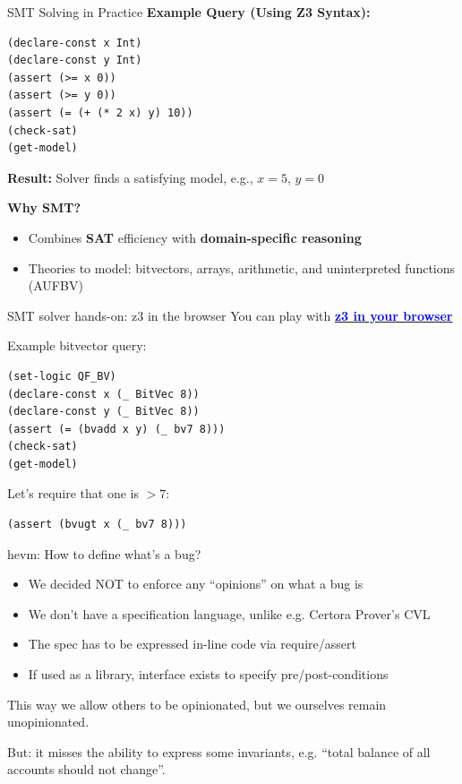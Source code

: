 \documentclass[aspectratio=169]{beamer}
\newcommand{\bluelink}[2]{\href{#1}{\textcolor{blue}{\textbf{#2}}}}
\begin{document}
\begin{frame}[fragile=singleslide]{SMT Solving in Practice}
\textbf{Example Query (Using Z3 Syntax):}
\begin{lstlisting}[language=smtlib]
(declare-const x Int)
(declare-const y Int)
(assert (>= x 0))
(assert (>= y 0))
(assert (= (+ (* 2 x) y) 10))
(check-sat)
(get-model)
\end{lstlisting}
\textbf{Result:}
Solver finds a satisfying model, e.g., $x = 5$, $y = 0$
\bigskip

\textbf{Why SMT?}
\begin{itemize}
    \item Combines \textbf{SAT} efficiency with \textbf{domain-specific reasoning}
    \item Theories to model: bitvectors, arrays, arithmetic, and
        uninterpreted functions (AUFBV)
\end{itemize}
\end{frame}

\begin{frame}[fragile=singleslide]{SMT solver hands-on: z3 in the browser}
You can play with \bluelink{https://jfmc.github.io/z3-play/}{z3 in your browser}
\bigskip

Example bitvector query:
\begin{lstlisting}[language=smtlib]
(set-logic QF_BV)
(declare-const x (_ BitVec 8))
(declare-const y (_ BitVec 8))
(assert (= (bvadd x y) (_ bv7 8)))
(check-sat)
(get-model)
\end{lstlisting}
\bigskip

Let's require that one is $>7$:
\begin{lstlisting}[language=smtlib]
(assert (bvugt x (_ bv7 8)))
\end{lstlisting}
\end{frame}

\begin{frame}{hevm: How to define what's a bug?}
\begin{itemize}
    \item We decided NOT to enforce any ``opinions'' on what a bug is
    \item We don't have a specification language, unlike e.g. Certora Prover's CVL
    \item The spec has to be expressed in-line code via require/assert
    \item If used as a library, interface exists to specify pre/post-conditions
\end{itemize}

\bigskip
This way we allow others to be opinionated, but we ourselves remain unopinionated.

But: it misses the ability to express some invariants, e.g. ``total balance of
all accounts should not change''.
\end{frame}
\end{document}
